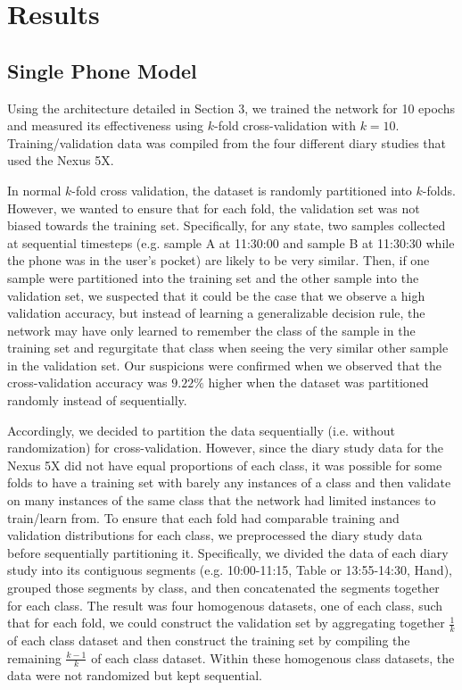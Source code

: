 \section{Results}
\subsection{Single Phone Model}
Using the architecture detailed in Section 3, we trained the network for 10 epochs
and measured its effectiveness using $k$-fold cross-validation with $k = 10$.
Training/validation data was compiled from the four different diary studies
that used the Nexus 5X.

In normal $k$-fold cross validation, the dataset is randomly partitioned into
$k$-folds. However, we wanted to ensure that for each fold, the validation set
was not biased towards the training set. Specifically, for any state, two samples collected at sequential timesteps
(e.g. sample A at 11:30:00 and sample B at 11:30:30 while the phone was in 
the user's pocket) are likely to be very similar. Then, if one sample 
were partitioned into the training set and the other sample into the validation set, we suspected
that it could be the case that we observe a high validation accuracy, but instead of learning 
a generalizable decision rule, the network may have only learned to remember the class of the sample in the training set 
and regurgitate that class when seeing the very similar other sample in the validation set. 
Our suspicions were confirmed when we observed that the cross-validation accuracy
was $9.22\%$ higher when the dataset was partitioned randomly instead of sequentially.

Accordingly, we decided to partition the data sequentially (i.e. without randomization)
for cross-validation. However, since the diary study data for the Nexus 5X
did not have equal proportions of each class, it was possible for some folds
to have a training set with barely any instances of a class and then validate
on many instances of the same class that the network had limited instances
to train/learn from. To ensure that each fold had comparable training and validation distributions 
for each class, we preprocessed the diary study data before sequentially partitioning it. 
Specifically, we divided the data of each diary study into its 
contiguous segments (e.g. 10:00-11:15, Table or 13:55-14:30, Hand), grouped 
those segments by class, and then concatenated the segments together for each class. The result was four 
homogenous datasets, one of each class, such that for each fold, we could construct
the validation set by aggregating together $\frac{1}{k}$ of each class dataset and then
construct the training set by compiling the remaining $\frac{k - 1}{k}$ of each class dataset.
Within these homogenous class datasets, the data were not randomized but 
kept sequential.

